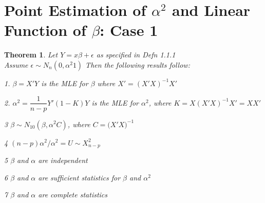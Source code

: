 \documentclass[12pt]{article}
\newtheorem{theorem}{\bf{Theorem}}[section]
\numberwithin{equation}{section}
\begin{document}
\section{Point Estimation of $\alpha^{2}$ and Linear Function of $\beta$: Case 1}
\begin{theorem}
Let $Y = x\beta + \epsilon$ as specified in Defn 1.1.1\\
Assume $\epsilon \sim N_{n}(0,\alpha^{2}1)$ Then the following results follow:
\item[1.] ${\beta} = X'{Y}$ is the MLE for ${\beta}$ where $X' = (X'X)^{-1}X'$
\item[2.] $\alpha^{2} = \dfrac{1}{n-p}Y'(1-K){Y}$ is the MLE for $\alpha^{2}$, where $K = X(X'X)^{-1}X' = XX'$ 
\item[3]  ${\beta} \sim N_{10}({\beta},\alpha^{2}C)$, where $C =\big( X'X\big)^{-1}$
\item[4] $(n-p){\alpha}^{2}/\alpha^{2} = U \sim X_{n-p}^{2}$
\item[5] ${\beta}$ and ${\alpha}$ are independent
\item[6] ${\beta}$ and ${\alpha}$ are sufficient statistics for ${\beta}$ and $\alpha^{2}$
\item[7] ${\beta}$ and ${\alpha}$ are complete statistics


\end{theorem}
\end{document}
